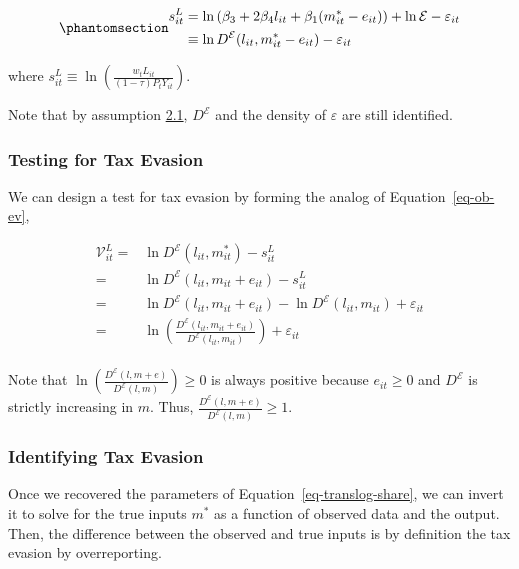 \documentclass[
  12pt]{article}
\theoremstyle{definition}
\theoremstyle{remark}
\begin{document}
\begin{equation}\phantomsection\label{eq-translog-share}{
\begin{aligned}
    s_{it}^{L}&=\ln \left(\beta_3+2\beta_4l_{it}+\beta_1(m^*_{it}-e_{it})\right) + \ln \mathcal{E}- \varepsilon_{it} \\
    &\equiv \ln D^{\mathcal{E}}(l_{it},m^*_{it}-e_{it})- \varepsilon_{it} 
\end{aligned}
}\end{equation}

where
\(s_{it}^{L} \equiv\ln\left(\frac{w_t L_{it}}{(1-\tau)P_{t}Y_{it}}\right)\).

Note that by assumption \hyperref[ass-non-ev]{2.1}, \(D^{\mathcal{E}}\)
and the density of \(\varepsilon\) are still identified.

\subsubsection{Testing for Tax Evasion}\label{testing-for-tax-evasion}

We can design a test for tax evasion by forming the analog of
Equation~\ref{eq-ob-ev},

\[
\begin{aligned}
\mathcal{V}_{it}^{L} =&\ln D^{\mathcal{E}}(l_{it},m_{it}^*)-s_{it}^L\\
    =&\ln D^{\mathcal{E}}(l_{it},m_{it}+e_{it})-s_{it}^L\\
    =&\ln D^{\mathcal{E}}(l_{it},m_{it}+e_{it})-\ln D^{\mathcal{E}}(l_{it},m_{it})+\varepsilon_{it}\\
    =&\ln\left(\frac{D^{\mathcal{E}}(l_{it},m_{it}+e_{it})}{D^{\mathcal{E}}(l_{it},m_{it})}\right)+\varepsilon_{it}\\
\end{aligned}
\]

Note that
\(\ln\left(\frac{D^{\mathcal{E}}(l,m+e)}{D^{\mathcal{E}}(l,m)}\right)\ge0\)
is always positive because \(e_{it}\ge0\) and \(D^{\mathcal{E}}\) is
strictly increasing in \(m\). Thus,
\(\frac{D^{\mathcal{E}}(l,m+e)}{D^{\mathcal{E}}(l,m)}\ge1\).

\subsubsection{Identifying Tax Evasion}\label{identifying-tax-evasion-1}

Once we recovered the parameters of Equation~\ref{eq-translog-share}, we
can invert it to solve for the true inputs \(m^*\) as a function of
observed data and the output. Then, the difference between the observed
and true inputs is by definition the tax evasion by overreporting.
\end{document}
